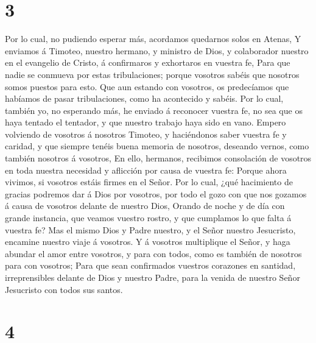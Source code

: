\hypertarget{section-2}{%
\section{3}\label{section-2}}

 Por lo cual, no pudiendo esperar más, acordamos quedarnos
solos en Atenas,  Y enviamos á Timoteo, nuestro hermano, y
ministro de Dios, y colaborador nuestro en el evangelio de Cristo, á
confirmaros y exhortaros en vuestra fe,  Para que nadie se
conmueva por estas tribulaciones; porque vosotros sabéis que nosotros
somos puestos para esto.  Que aun estando con vosotros, os
predecíamos que habíamos de pasar tribulaciones, como ha acontecido y
sabéis.  Por lo cual, también yo, no esperando más, he
enviado á reconocer vuestra fe, no sea que os haya tentado el tentador,
y que nuestro trabajo haya sido en vano.  Empero volviendo
de vosotros á nosotros Timoteo, y haciéndonos saber vuestra fe y
caridad, y que siempre tenéis buena memoria de nosotros, deseando
vernos, como también nosotros á vosotros,  En ello,
hermanos, recibimos consolación de vosotros en toda nuestra necesidad y
aflicción por causa de vuestra fe:  Porque ahora vivimos,
si vosotros estáis firmes en el Señor.  Por lo cual, ¿qué
hacimiento de gracias podremos dar á Dios por vosotros, por todo el gozo
con que nos gozamos á causa de vosotros delante de nuestro Dios,
 Orando de noche y de día con grande instancia, que
veamos vuestro rostro, y que cumplamos lo que falta á vuestra fe?
 Mas el mismo Dios y Padre nuestro, y el Señor nuestro
Jesucristo, encamine nuestro viaje á vosotros.  Y á
vosotros multiplique el Señor, y haga abundar el amor entre vosotros, y
para con todos, como es también de nosotros para con vosotros;
 Para que sean confirmados vuestros corazones en
santidad, irreprensibles delante de Dios y nuestro Padre, para la venida
de nuestro Señor Jesucristo con todos sus santos.

\hypertarget{section-3}{%
\section{4}\label{section-3}}

